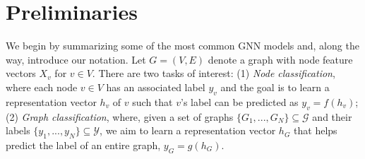 
\vspace*{-5pt}

\section{Preliminaries}
\label{sec:preliminary}

We begin by summarizing some of the most common GNN models and, along the way, introduce our notation. Let $G = \left(V, E \right)$ denote a graph with node feature vectors $X_v$ for $v \in V$. There are two tasks of interest: (1) {\em Node classification}, where each node $v \in V$ has an associated label $y_v$ and the goal is to learn a representation vector $h_v$ of $v$ such that $v$'s label can be predicted as $y_v=f(h_v)$;
(2) {\em Graph classification}, where, given a set of graphs $ \{G_1, ..., G_N\} \subseteq \mathcal{G}$ and their labels $\{y_1, ..., y_N \} \subseteq \mathcal{Y}$, we aim to learn a representation vector $h_G$ that helps predict the label of an entire graph, $y_G=g(h_G)$.


